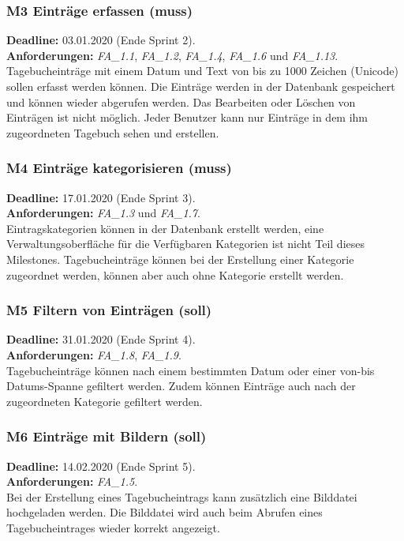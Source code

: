 \subsubsection*{M3 Einträge erfassen (muss)}
\textbf{Deadline: } 03.01.2020 (Ende Sprint 2). \\
\textbf{Anforderungen: }\emph{FA\_1.1}, \emph{FA\_1.2}, \emph{FA\_1.4}, \emph{FA\_1.6} und \emph{FA\_1.13}.\\
Tagebucheinträge mit einem Datum und Text von bis zu 1000 Zeichen (Unicode) sollen erfasst werden können. Die Einträge werden in der Datenbank gespeichert und können wieder abgerufen werden. Das Bearbeiten oder Löschen von Einträgen ist nicht möglich. Jeder Benutzer kann nur Einträge in dem ihm zugeordneten Tagebuch sehen und erstellen.

\subsubsection*{M4 Einträge kategorisieren (muss)}
\textbf{Deadline: } 17.01.2020 (Ende Sprint 3). \\
\textbf{Anforderungen: }\emph{FA\_1.3} und \emph{FA\_1.7}.\\
Eintragskategorien können in der Datenbank erstellt werden, eine Verwaltungsoberfläche für die Verfügbaren Kategorien ist nicht Teil dieses Milestones. Tagebucheinträge können bei der Erstellung einer Kategorie zugeordnet werden, können aber auch ohne Kategorie erstellt werden.

\subsubsection*{M5 Filtern von Einträgen (soll)}
\textbf{Deadline: } 31.01.2020 (Ende Sprint 4). \\
\textbf{Anforderungen: }\emph{FA\_1.8}, \emph{FA\_1.9}.\\
Tagebucheinträge können nach einem bestimmten Datum oder einer von-bis Datums-Spanne gefiltert werden. Zudem können Einträge auch nach der zugeordneten Kategorie gefiltert werden.

\subsubsection*{M6 Einträge mit Bildern (soll)}
\textbf{Deadline: } 14.02.2020 (Ende Sprint 5). \\
\textbf{Anforderungen: }\emph{FA\_1.5}.\\
Bei der Erstellung eines Tagebucheintrags kann zusätzlich eine Bilddatei hochgeladen werden. Die Bilddatei wird auch beim Abrufen eines Tagebucheintrages wieder korrekt angezeigt.

